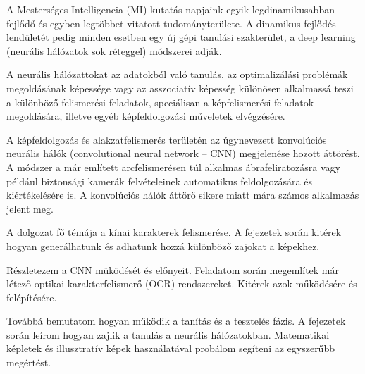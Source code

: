 
A Mesterséges Intelligencia (MI) kutatás napjaink egyik legdinamikusabban fejlődő és egyben legtöbbet vitatott tudományterülete. A dinamikus fejlődés lendületét pedig minden esetben egy új gépi tanulási szakterület, a deep learning (neurális hálózatok sok réteggel) módszerei adják.

A neurális hálózattokat az adatokból való tanulás, az optimalizálási problémák megoldásának képessége vagy az asszociatív képesség különösen alkalmassá teszi a különböző felismerési feladatok, speciálisan a képfelismerési feladatok megoldására, illetve egyéb képfeldolgozási műveletek elvégzésére.

A képfeldolgozás és alakzatfelismerés területén az úgynevezett konvolúciós neurális hálók (convolutional neural network – CNN) megjelenése hozott áttörést. A módszer a már említett arcfelismerésen túl alkalmas ábrafeliratozásra vagy például biztonsági kamerák felvételeinek automatikus feldolgozására és kiértékelésére is. A konvolúciós hálók áttörő sikere miatt mára számos alkalmazás jelent meg.

A dolgozat fő témája a kínai karakterek felismerése. A fejezetek során kitérek hogyan generálhatunk és adhatunk hozzá különböző zajokat a képekhez.

Részletezem a CNN müködését és előnyeit. Feladatom során megemlítek már létező optikai karakterfelismerő (OCR) rendszereket. Kitérek azok működésére és felépítésére.

Továbbá bemutatom hogyan működik a tanítás és a tesztelés fázis. A fejezetek során leírom hogyan zajlik a tanulás a neurális hálózatokban. Matematikai képletek és illusztratív képek használatával probálom segíteni az egyszerűbb megértést.
